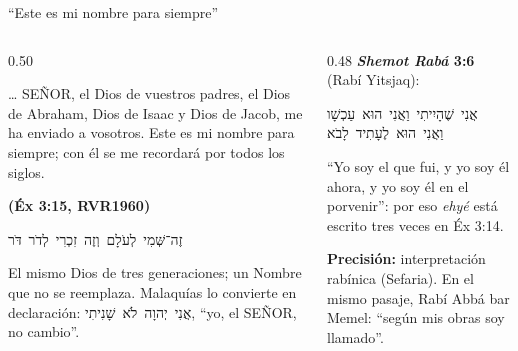 \documentclass[hyperref={bookmarks=false},aspectratio=169]{beamer}
\newcommand{\heb}[1]{\mbox{\foreignlanguage{hebrew}{#1}}}
\newcommand{\SENOR}{S{\fontsize{0.78em}{1em}\selectfont EÑOR}}
\newcommand{\fuente}[1]{\par\hfill{\upshape\bfseries\footnotesize\textcolor{azul}{#1}}}
\newcommand{\precision}[1]{{\footnotesize\color{gris}\textbf{Precisión:} #1}}
\begin{document}
\begin{frame}{``Este es mi nombre para siempre''}
\begin{columns}[t,onlytextwidth]
\begin{column}{0.50\textwidth}
\begin{cita}\ldots{} \SENOR, el Dios de vuestros padres, el Dios de Abraham, Dios de Isaac y Dios de Jacob, me ha enviado a vosotros. Este es mi nombre para siempre; con él se me recordará por todos los siglos.\fuente{(Éx 3:15, RVR1960)}\end{cita}
\begin{center}\heb{זֶה־שְּׁמִי לְעֹלָם וְזֶה זִכְרִי לְדֹר דֹּר}\end{center}
\small El mismo Dios de tres generaciones; un Nombre que no se reemplaza. Malaquías lo convierte en declaración: \heb{אֲנִי יְהוָה לֹא שָׁנִיתִי}, ``yo, el \SENOR, no cambio''.
\end{column}
\begin{column}{0.48\textwidth}\small
\textbf{\emph{Shemot Rabá} 3:6} (Rabí Yitsjaq):
\begin{center}\heb{אֲנִי שֶׁהָיִיתִי וַאֲנִי הוּא עַכְשָׁו}\\ \heb{וַאֲנִי הוּא לֶעָתִיד לָבֹא}\end{center}
``Yo soy el que fui, y yo soy él ahora, y yo soy él en el porvenir'': por eso \emph{ehyé} está escrito tres veces en Éx 3:14.\par\smallskip
\precision{interpretación rabínica (Sefaria). En el mismo pasaje, Rabí Abbá bar Memel: ``según mis obras soy llamado''.}
\end{column}
\end{columns}
\end{frame}
\end{document}
